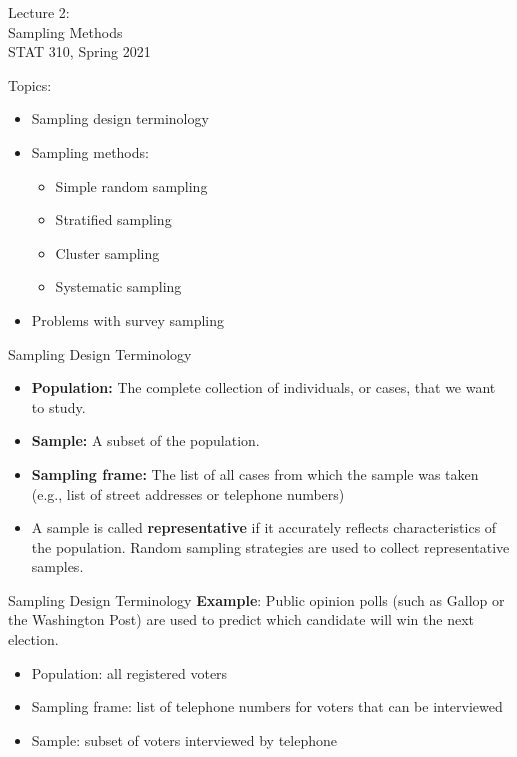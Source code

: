 \documentclass{beamer}
\begin{document}
\begin{frame}
\large
Lecture 2:\\
Sampling Methods\\
STAT 310, Spring 2021
\end{frame}

\begin{frame}
Topics:
\vspace{5pt}
\begin{itemize}
\item Sampling design terminology
\vspace{5pt}
\item Sampling methods:
\begin{itemize}
\item Simple random sampling
\item Stratified sampling
\item Cluster sampling
\item Systematic sampling
\end{itemize}
\vspace{5pt}
\item Problems with survey sampling
\end{itemize}
\end{frame}

\begin{frame}{Sampling Design Terminology}
\begin{itemize}
\item \textbf{Population:}  The complete collection of individuals, or cases, that we want to study.
\vspace{5pt}
\item \textbf{Sample:} A subset of the population.
\vspace{5pt}
\item \textbf{Sampling frame:}  The list of all cases from which the sample was taken (e.g., list of street addresses or telephone numbers)
\vspace{5pt}
\item A sample is called \textbf{representative} if it accurately reflects characteristics of the population.  Random sampling strategies are used to collect representative samples. 
\end{itemize}
\end{frame}

\begin{frame}{Sampling Design Terminology}
\textbf{Example}: Public opinion polls (such as Gallop or the Washington Post) are used to predict which candidate will win the next election.\\

\begin{itemize}
\item Population: all registered voters
\item Sampling frame:  list of telephone numbers for voters that can be interviewed
\item Sample: subset of voters interviewed by telephone     
\end{itemize}
\end{frame}
\end{document}
